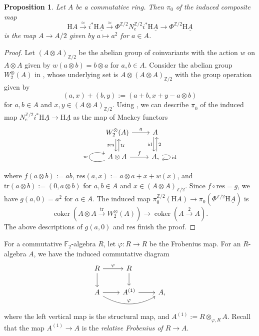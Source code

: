 \documentclass[10pt]{amsart}
\newtheorem{prop}[thm]{Proposition}
\theoremstyle{definition}
\numberwithin{equation}{section}
\newcommand{\F}{\mathbb{F}}
\newcommand{\Z}{\mathbb{Z}}
\newcommand{\rH}{\mathrm{H}}
\newcommand{\ul}{\underline}
\DeclareMathOperator{\coker}{coker}
\newcommand{\id}{\mathrm{id}}
\newcommand{\tr}{\mathrm{tr}}
\newcommand{\res}{\mathrm{res}}
\begin{document}
{\begin{prop}
\label{geometric.3}
Let $A$ be a commutative ring.
Then $\pi_0$ of the induced composite map
\[
\rH A
\xrightarrow{\simeq}
i^*\rH \ul{A}
\xrightarrow{\simeq}
\Phi^{\Z/2}
N_e^{\Z/2}i^*
\rH \ul{A}
\to
\Phi^{\Z/2}
\rH \ul{A}
\]
is the map $A\to A/2$ given by $a\mapsto a^2$ for $a\in A$.
\end{prop}
\begin{proof}
Let $(A\otimes A)_{\Z/2}$ be the abelian group of coinvariants with the action $w$ on $A\otimes A$ given by $w(a\otimes b)=b\otimes a$ for $a,b\in A$.
Consider the abelian group $W_2^\otimes(A)$ in \cite[Definition 5.3]{DMPR21},
whose underlying set is $A\otimes (A\otimes A)_{\Z/2}$ with the group operation given by
\[
(a,x)+(b,y):=(a+b,x+y-a\otimes b)
\]
for $a,b\in A$ and $x,y\in (A\otimes A)_{\Z/2}$.
Using \cite[Proposition 5.5]{DMPR21},
we can describe $\ul{\pi}_0$ of the induced map $N_e^{\Z/2}i^*\rH \ul{A}\to \rH \ul{A}$ as the map of Mackey functors
\[
\begin{tikzcd}
W_2^\otimes(A)\ar[r,"g"]
\ar[d,"\res"',shift right=0.5ex]
\ar[d,"\tr",shift left=0.5ex,leftarrow]
&
A\ar[d,"\id"',shift right=0.5ex]
\ar[d,"2",shift left=0.5ex,leftarrow]
\\
A\otimes A\ar[loop left,"w"]\ar[r,"f"]&
A,\ar[loop right,"\id"]
\end{tikzcd}
\]
where $f(a\otimes b):=ab$, $\res(a,x):=a\otimes a+x+w(x)$, and $\tr(a\otimes b):=(0,a\otimes b)$ for $a,b\in A$ and $x\in (A\otimes A)_{\Z/2}$.
Since $f\circ \res=g$,
we have $g(a,0)=a^2$ for $a\in A$.
The induced map $\pi_0^{\Z/2}(\rH A)\to \pi_0(\Phi^{\Z/2}\rH \ul{A})$ is
\[
\coker(A\otimes A\xrightarrow{\tr} W_2^{\otimes}(A))
\to
\coker(A\xrightarrow{2} A).
\]
The above descriptions of $g(a,0)$ and $\res$ finish the proof.
\end{proof}

For a commutative $\F_2$-algebra $R$,
let $\varphi\colon R\to R$ be the Frobenius map.
For
an $R$-algebra $A$,
we have the induced commutative diagram
\begin{equation}
\label{geometric.3.1}
\begin{tikzcd}
R\ar[r,"\varphi"]\ar[d]&
R\ar[d]
\\
A\ar[r]\ar[rr,bend right,"\varphi"]&
A^{(1)}\ar[r]&
A,
\end{tikzcd}
\end{equation}
where the left vertical map is the structural map, and
$A^{(1)}:=R\otimes_{\varphi,R}A$.
Recall that the map $A^{(1)}\to A$ is the \emph{relative Frobenius of $R\to A$}.

}
\end{document}

